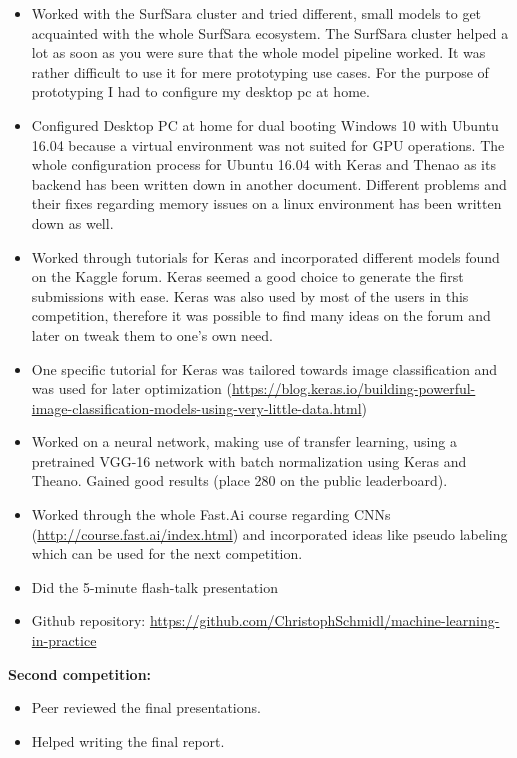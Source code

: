 \documentclass[a4paper]{article}
\begin{document}
\begin{itemize}
	\item Worked with the SurfSara cluster and tried different, small models to get acquainted with the whole SurfSara ecosystem. The SurfSara cluster helped a lot as soon as you were sure that the whole model pipeline worked. It was rather difficult to use it for mere prototyping use cases. For the purpose of prototyping I had to configure my desktop pc at home.
	\item Configured Desktop PC at home for dual booting Windows 10 with Ubuntu 16.04 because a virtual environment was not suited for GPU operations. The whole configuration process for Ubuntu 16.04 with Keras and Thenao as its backend has been written down in another document. Different problems and their fixes regarding memory issues on a linux environment has been written down as well.
	\item Worked through tutorials for Keras and incorporated different models found on the Kaggle forum. Keras seemed a good choice to generate the first submissions with ease. Keras was also used by most of the users in this competition, therefore it was possible to find many ideas on the forum and later on tweak them to one’s own need.
	\item One specific tutorial for Keras was tailored towards image classification and was used for later optimization (\url{https://blog.keras.io/building-powerful-image-classification-models-using-very-little-data.html})
	\item Worked on a neural network, making use of transfer learning, using a pretrained VGG-16 network with batch normalization using Keras and Theano. Gained good results (place 280 on the public leaderboard).
	\item Worked through the whole Fast.Ai course regarding CNNs (\url{http://course.fast.ai/index.html}) and incorporated ideas like pseudo labeling which can be used for the next competition.
	\item Did the 5-minute flash-talk presentation
	\item Github repository: \url{https://github.com/ChristophSchmidl/machine-learning-in-practice}
	
\end{itemize}

\noindent\textbf{Second competition:}

\begin{itemize}
	\item Peer reviewed the final presentations.
	\item Helped writing the final report.
\end{itemize}
\end{document}
